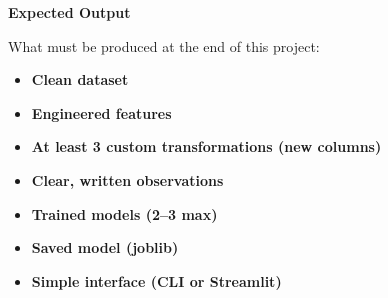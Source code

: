 \documentclass{article}
\begin{document}
\vspace{1em}

\noindent\Large\textbf{Expected Output}

\vspace{0.5em}

\noindent What must be produced at the end of this project:

\vspace{0.5em}

\begin{itemize}[leftmargin=*]
    \item \textbf{Clean dataset}
    \item \textbf{Engineered features}
    \item \textbf{At least 3 custom transformations (new columns)}
    \item \textbf{Clear, written observations}
    \item \textbf{Trained models (2--3 max)}
    \item \textbf{Saved model (joblib)}
    \item \textbf{Simple interface (CLI or Streamlit)}
\end{itemize}
\end{document}
